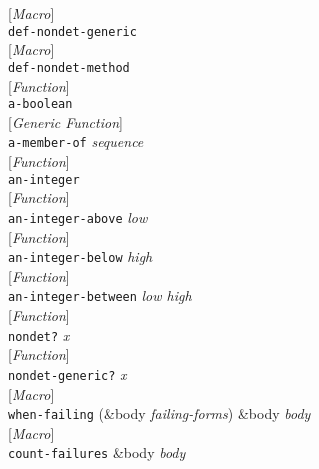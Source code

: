 \documentclass[10pt]{book}
\newenvironment{defother}[2]{[\textit{#1}]\\\texttt{#2}}{\\}
\newenvironment{defun}[1]{\begin{defother}{Function}{#1}}{\end{defother}}
\newenvironment{defgeneric}[1]{\begin{defother}{Generic Function}{#1}}{\end{defother}}
\newenvironment{defmacro}[1]{\begin{defother}{Macro}{#1}}{\end{defother}}
\begin{document}
\begin{defmacro}{def-nondet-generic}\end{defmacro} %
\begin{defmacro}{def-nondet-method}\end{defmacro}
\begin{defun}{a-boolean}\end{defun}
\begin{defgeneric}{a-member-of} \textit{sequence}\end{defgeneric}
\begin{defun}{an-integer}\end{defun}
\begin{defun}{an-integer-above} \textit{low}\end{defun}
\begin{defun}{an-integer-below} \textit{high}\end{defun}
\begin{defun}{an-integer-between} \textit{low high}\end{defun}
\begin{defun}{nondet?} \textit{x}\end{defun}
\begin{defun}{nondet-generic?} \textit{x}\end{defun} %
\begin{defmacro}{when-failing} (\&body \textit{failing-forms}) \&body \textit{body}\end{defmacro}
\begin{defmacro}{count-failures} \&body \textit{body} \end{defmacro}

\end{document}
